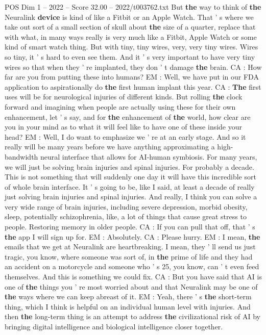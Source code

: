 \begin{textsample}{POS Dim 1 – 2022 – Score 32.00 – 2022/t003762.txt}
But \textbf{the} way to think of \textbf{the} Neuralink \textbf{device} is kind of like a Fitbit or an Apple Watch.
That ' s where we take out sort of a small section of skull about \textbf{the} size of a quarter, replace that with what, in many ways really is very much like a Fitbit, Apple Watch or some kind of smart watch thing.
But with tiny, tiny wires, very, very tiny wires.
Wires so tiny, it ' s hard to even see them.
And it ' s very important to have very tiny wires so that when they ' re implanted, they don ' t damage \textbf{the} brain.
CA : How far are you from putting these into humans?
EM : Well, we have put in our FDA application to aspirationally do \textbf{the} first human implant this year.
CA : \textbf{The} first uses will be for neurological injuries of different kinds.
But rolling \textbf{the} clock forward and imagining when people are actually using these for their own enhancement, let ' s say, and for \textbf{the} enhancement of \textbf{the} world, how clear are you in your mind as to what it will feel like to have one of these inside your head?
EM : Well, I do want to emphasize we ' re at an early stage.
And so it really will be many years before we have anything approximating a high-bandwidth neural interface that allows for AI-human symbiosis.
For many years, we will just be solving brain injuries and spinal injuries.
For probably a decade.
This is not something that will suddenly one day it will have this incredible sort of whole brain interface.
It ' s going to be, like I said, at least a decade of really just solving brain injuries and spinal injuries.
And really, I think you can solve a very wide range of brain injuries, including severe depression, morbid obesity, sleep, potentially schizophrenia, like, a lot of things that cause great stress to people.
Restoring memory in older people.
CA : If you can pull that off, that ' s \textbf{the} app I will sign up for.
EM : Absolutely.
CA : Please hurry.
EM : I mean, \textbf{the} emails that we get at Neuralink are heartbreaking.
I mean, they ' ll send us just tragic, you know, where someone was sort of, in \textbf{the} prime of life and they had an accident on a motorcycle and someone who ' s 25, you know, can ' t even feed themselves.
And this is something we could fix.
CA : But you have said that AI is one of \textbf{the} things you ' re most worried about and that Neuralink may be one of \textbf{the} ways where we can keep abreast of it.
EM : Yeah, there ' s \textbf{the} short-term thing, which I think is helpful on an individual human level with injuries.
And then \textbf{the} long-term thing is an attempt to address \textbf{the} civilizational risk of AI by bringing digital intelligence and biological intelligence closer together.

\end{textsample}
